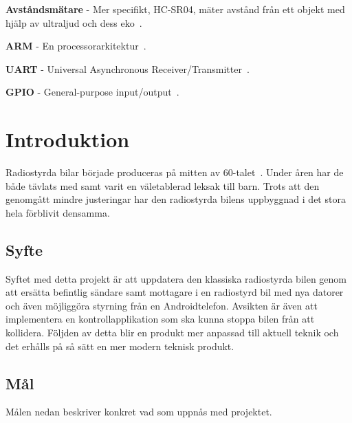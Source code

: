 \documentclass[a4paper]{article}
\begin{document}
\vspace{5mm} \noindent
{\bf Avståndsmätare} - Mer specifikt, HC-SR04, mäter avstånd från ett objekt med hjälp av ultraljud och dess eko~\cite{DistMeasure}.

\vspace{5mm} \noindent
{\bf ARM} - En processorarkitektur~\cite{chalmersARM}.

\vspace{5mm} \noindent
{\bf UART} - Universal Asynchronous Receiver/Transmitter~\cite{chalmersARM}.


\vspace{5mm} \noindent
{\bf GPIO} - General-purpose input/output~\cite{chalmersARM}.



\newpage
\section{Introduktion}

Radiostyrda bilar började produceras på mitten av 60-talet~\cite{RCHistory}. Under åren har de både tävlats med samt varit en väletablerad leksak till barn. Trots att den genomgått mindre justeringar har den radiostyrda bilens uppbyggnad i det stora hela förblivit densamma.

\subsection{Syfte}

Syftet med detta projekt är att uppdatera den klassiska radiostyrda bilen genom att ersätta befintlig sändare samt mottagare i en radiostyrd bil med nya datorer och även möjliggöra styrning från en Androidtelefon. Avsikten är även att implementera en kontrollapplikation som ska kunna stoppa bilen från att kollidera. Följden av detta blir en produkt mer anpassad till aktuell teknik och det erhålls på så sätt en mer modern teknisk produkt.



\subsection{Mål}
Målen nedan beskriver konkret vad som uppnås med projektet.
\end{document}
